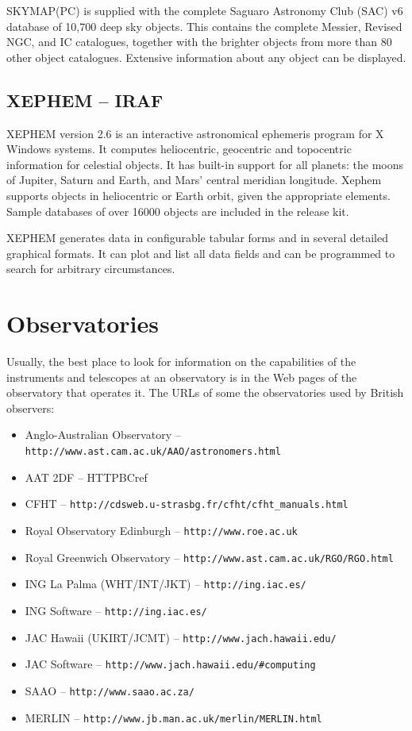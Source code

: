 \documentclass[twoside,11pt]{article}
\newcommand{\htmladdnormallink}[2]{#1}
\newcommand{\xlabel}[1]{}
\newcommand{\IRAFref}{\htmladdnormallink{IRAF}{http://www.starlink.ac.uk/iraf/}}
\newcommand{\SKYMAPPCref}{\htmladdnormallink{SKYMAP(PC)}{http://www.skymap.com}}
\newcommand{\HTTPGref}{\htmladdnormallink{\tt http://www.ast.cam.ac.uk/AAO/astronomers.html}{http://www.ast.cam.ac.uk/AAO/astronomers.html}}
\newcommand{\HTTPHref}{\htmladdnormallink{\tt http://www.roe.ac.uk}{http://www.roe.ac.uk}}
\newcommand{\HTTPIref}{\htmladdnormallink{\tt http://www.ast.cam.ac.uk/RGO/RGO.html}{http://www.ast.cam.ac.uk/RGO/RGO.html}}
\newcommand{\HTTPJref}{\htmladdnormallink{\tt http://ing.iac.es/}{http://ing.iac.es/}}
\newcommand{\HTTPKref}{\htmladdnormallink{\tt http://www.jach.hawaii.edu/}{http://www.jach.hawaii.edu/}}
\newcommand{\HTTPLref}{\htmladdnormallink{\tt http://www.jach.hawaii.edu/\#{}computing}{http://www.jach.hawaii.edu/\#{}computing}}
\newcommand{\HTTPBZref}{\htmladdnormallink{\tt http://cdsweb.u-strasbg.fr/cfht/cfht\_{}manuals.html}{http://cdsweb.u-strasbg.fr/cfht/cfht\_{}manuals.html}}
\newcommand{\HTTPBAref}{\htmladdnormallink{\tt http://www.saao.ac.za/}{http://www.saao.ac.za/}}
\newcommand{\HTTPBBref}{\htmladdnormallink{\tt http://www.jb.man.ac.uk/merlin/MERLIN.html}{http://www.jb.man.ac.uk/merlin/MERLIN.html}}
\begin{document}
{\SKYMAPPCref} is supplied with the complete Saguaro Astronomy Club (SAC) v6 database
of 10,700 deep sky objects. This contains the complete Messier, Revised NGC, and IC
catalogues, together with the brighter objects from more than 80 other object
catalogues. Extensive information about any object can be displayed.

\subsection{XEPHEM -- {\IRAFref}}   \xlabel{XEPHEM}
\label{sec:xephem}

XEPHEM version 2.6 is an interactive astronomical ephemeris program for X
Windows systems. It computes heliocentric, geocentric and topocentric
information for celestial objects. It has built-in support for all
planets: the moons of Jupiter, Saturn and Earth, and Mars' central meridian
longitude. Xephem supports objects in heliocentric or Earth orbit, given the
appropriate elements. Sample databases of over 16000 objects are included in
the release kit.

XEPHEM generates data in configurable tabular forms and in several detailed
graphical formats. It can plot and list all data fields and can be
programmed to search for arbitrary circumstances.


\section{Observatories} \xlabel{OBSERVATORIES}
\label{sec:observatories}


Usually, the best place to look for information on the capabilities of the
instruments and telescopes at an observatory is in the Web pages of
the observatory that operates it. The URLs of some the observatories
used by British observers:

\begin{itemize}
\item Anglo-Australian Observatory -- {\HTTPGref}
\item AAT 2DF -- {HTTPBCref}
\item CFHT -- {\HTTPBZref}
\item Royal Observatory Edinburgh -- {\HTTPHref}
\item Royal Greenwich Observatory -- {\HTTPIref}
\item ING La Palma (WHT/INT/JKT) -- {\HTTPJref}
\item ING Software -- {\HTTPJref}
\item JAC Hawaii (UKIRT/JCMT) -- {\HTTPKref}
\item JAC Software -- {\HTTPLref}
\item SAAO -- {\HTTPBAref}
\item MERLIN -- {\HTTPBBref}
\end {itemize}
\end{document}
